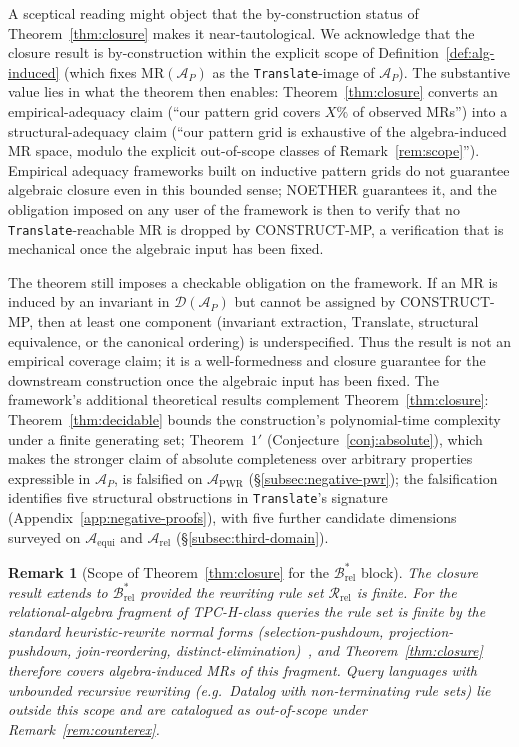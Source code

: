 \documentclass[manuscript]{acmart}
\newtheorem{remark}{Remark}
\begin{document}
A sceptical reading might object that the by-construction status of Theorem~\ref{thm:closure} makes it near-tautological. We acknowledge that the closure result is by-construction within the explicit scope of Definition~\ref{def:alg-induced} (which fixes $\mathrm{MR}(\mathcal{A}_P)$ as the \texttt{Translate}-image of $\mathcal{A}_P$). The substantive value lies in what the theorem then enables: Theorem~\ref{thm:closure} converts an empirical-adequacy claim (``our pattern grid covers $X\%$ of observed MRs'') into a structural-adequacy claim (``our pattern grid is exhaustive of the algebra-induced MR space, modulo the explicit out-of-scope classes of Remark~\ref{rem:scope}''). Empirical adequacy frameworks built on inductive pattern grids do not guarantee algebraic closure even in this bounded sense; NOETHER guarantees it, and the obligation imposed on any user of the framework is then to verify that no \texttt{Translate}-reachable MR is dropped by CONSTRUCT-MP, a verification that is mechanical once the algebraic input has been fixed.

The theorem still imposes a checkable obligation on the framework. If an MR is induced by an invariant in $\mathcal{D}(\mathcal{A}_P)$ but cannot be assigned by CONSTRUCT-MP, then at least one component (invariant extraction, $\mathrm{Translate}$, structural equivalence, or the canonical ordering) is underspecified. Thus the result is not an empirical coverage claim; it is a well-formedness and closure guarantee for the downstream construction once the algebraic input has been fixed. The framework's additional theoretical results complement Theorem~\ref{thm:closure}: Theorem~\ref{thm:decidable} bounds the construction's polynomial-time complexity under a finite generating set; Theorem~$1'$ (Conjecture~\ref{conj:absolute}), which makes the stronger claim of absolute completeness over arbitrary properties expressible in $\mathcal{A}_P$, is falsified on $\mathcal{A}_{\mathrm{PWR}}$ (\S\ref{subsec:negative-pwr}); the falsification identifies five structural obstructions in \texttt{Translate}'s signature (Appendix~\ref{app:negative-proofs}), with five further candidate dimensions surveyed on $\mathcal{A}_{\mathrm{equi}}$ and $\mathcal{A}_{\mathrm{rel}}$ (\S\ref{subsec:third-domain}).

\begin{remark}[Scope of Theorem~\ref{thm:closure} for the $\mathcal{B}^{*}_{\mathrm{rel}}$ block]
\label{rem:closure-brel}
The closure result extends to $\mathcal{B}^{*}_{\mathrm{rel}}$ provided the rewriting rule set $\mathcal{R}_{\mathrm{rel}}$ is finite. For the relational-algebra fragment of TPC-H-class queries the rule set is finite by the standard heuristic-rewrite normal forms (selection-pushdown, projection-pushdown, join-reordering, distinct-elimination)~\cite{Wang2024QED, Zhou2022SPES}, and Theorem~\ref{thm:closure} therefore covers algebra-induced MRs of this fragment. Query languages with unbounded recursive rewriting (e.g.\ Datalog with non-terminating rule sets) lie outside this scope and are catalogued as out-of-scope under Remark~\ref{rem:counterex}.
\end{remark}
\end{document}
